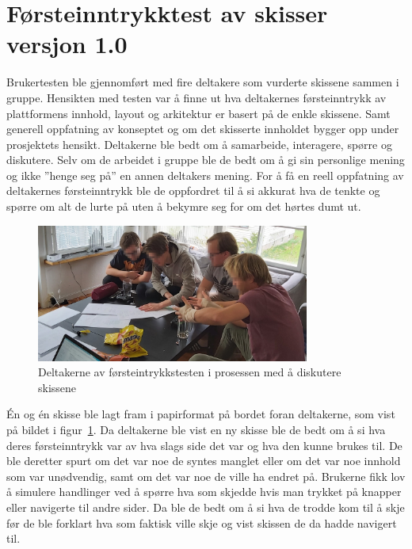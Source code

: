\section{Førsteinntrykktest av skisser versjon 1.0}
\label{section:brukertest-skisser-1}

Brukertesten ble gjennomført med fire deltakere som vurderte skissene sammen i gruppe. Hensikten med testen var å finne ut hva deltakernes førsteinntrykk av plattformens innhold, layout og arkitektur er basert på de enkle skissene. Samt generell oppfatning av konseptet og om det skisserte innholdet bygger opp under prosjektets hensikt. Deltakerne ble bedt om å samarbeide, interagere, spørre og diskutere. Selv om de arbeidet i gruppe ble de bedt om å gi sin personlige mening og ikke ''henge seg på'' en annen deltakers mening. For å få en reell oppfatning av deltakernes førsteinntrykk ble de oppfordret til å si akkurat hva de tenkte og spørre om alt de lurte på uten å bekymre seg for om det hørtes dumt ut.


\begin{figure}[H]
\includegraphics[width=0.8\textwidth]{Illustrasjoner/skissetest-bilde.jpg}
\centering
\caption{Deltakerne av førsteintrykkstesten i prosessen med å diskutere skissene}
\label{fig:skissetest}
\end{figure}

Én og én skisse ble lagt fram i papirformat på bordet foran deltakerne, som vist på bildet i figur~\ref{fig:skissetest}. Da deltakerne ble vist en ny skisse ble de bedt om å si hva deres førsteinntrykk var av hva slags side det var og hva den kunne brukes til. De ble deretter spurt om det var noe de syntes manglet eller om det var noe innhold som var unødvendig, samt om det var noe de ville ha endret på. Brukerne fikk lov å simulere handlinger ved å spørre hva som skjedde hvis man trykket på knapper eller navigerte til andre sider. Da ble de bedt om å si hva de trodde kom til å skje før de ble forklart hva som faktisk ville skje og vist skissen de da hadde navigert til.

